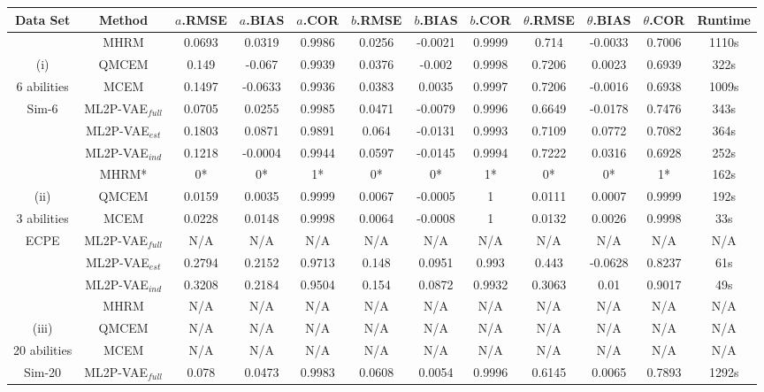 \begin{table}
\footnotesize{
\centering
\begin{tabular}{c|c|ccc|ccc|ccc|c}
  \hline
    Data Set & Method & $a$.RMSE & $a$.BIAS & $a$.COR & $b$.RMSE & $b$.BIAS & $b$.COR &  $\theta$.RMSE & $\theta$.BIAS & $\theta$.COR & Runtime \\
    \hline
& MHRM & 0.0693 & 0.0319  & 0.9986   & 0.0256 & -0.0021 & 0.9999  & 0.714  & -0.0033  & 0.7006 & 1110s \\ 
(i)& QMCEM & 0.149 & -0.067 & 0.9939 & 0.0376 & -0.002 & 0.9998 & 0.7206 & 0.0023 & 0.6939 & 322s\\
6 abilities& MCEM & 0.1497 & -0.0633 &  0.9936 &  0.0383 & 0.0035 & 0.9997 &  0.7206 & -0.0016 & 0.6938 & 1009s\\
Sim-6& ML2P-VAE$_{full}$ & 0.0705 &  0.0255  & 0.9985   & 0.0471 & -0.0079 & 0.9996  & 0.6649   & -0.0178  & 0.7476 & 343s\\
& ML2P-VAE$_{est}$ & 0.1803 & 0.0871  & 0.9891 &  0.064 & -0.0131 & 0.9993  & 0.7109 &  0.0772  & 0.7082 & 364s \\
& ML2P-VAE$_{ind}$ & 0.1218 & -0.0004 & 0.9944   & 0.0597 & -0.0145 & 0.9994  & 0.7222 &  0.0316  & 0.6928 & 252s\\
\hline 
& MHRM* & 0* & 0*&  1* &  0* &  0* &  1* & 0* & 0* &  1* & 162s \\
(ii)& QMCEM & 0.0159  & 0.0035 & 0.9999 & 0.0067  & -0.0005 & 1   & 0.0111 & 0.0007 & 0.9999 & 192s\\
3 abilities & MCEM & 0.0228 & 0.0148 & 0.9998 & 0.0064  & -0.0008 & 1   & 0.0132 & 0.0026 & 0.9998 & 33s \\
ECPE & ML2P-VAE$_{full}$ & N/A & N/A & N/A & N/A & N/A & N/A & N/A & N/A & N/A & N/A  \\
& ML2P-VAE$_{est}$ & 0.2794 & 0.2152 & 0.9713 & 0.148 & 0.0951  & 0.993 & 0.443 & -0.0628 & 0.8237 & 61s  \\
& ML2P-VAE$_{ind}$ & 0.3208 & 0.2184 & 0.9504 & 0.154 & 0.0872  & 0.9932  & 0.3063 & 0.01 & 0.9017 & 49s \\
\hline
& MHRM & N/A & N/A & N/A & N/A & N/A & N/A & N/A & N/A & N/A & N/A  \\
(iii)& QMCEM & N/A & N/A & N/A & N/A & N/A & N/A & N/A & N/A & N/A & N/A \\
20 abilities & MCEM & N/A & N/A & N/A & N/A & N/A & N/A & N/A & N/A & N/A & N/A  \\
Sim-20 & ML2P-VAE$_{full}$ & 0.078 &  0.0473  & 0.9983  & 0.0608 &  0.0054  & 0.9996  & 0.6145 &  0.0065  & 0.7893 & 1292s \\

\end{tabular}}
\end{table}

